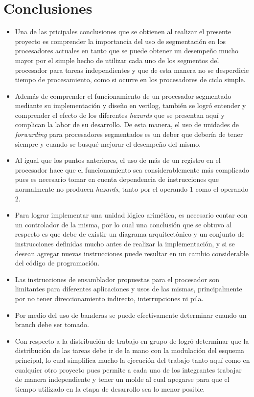 \newpage
\section{Conclusiones}

\begin{itemize}

\item Una de las pricipales conclusiones que se obtienen al realizar el presente proyecto es comprender la importancia del uso de segmentaci\' on en los procesadores actuales en tanto que se puede obtener un desempe\~ no mucho mayor por el simple hecho de utilizar cada uno de los segmentos del procesador para tareas independientes y que de esta manera no se desperdicie tiempo de procesamiento, como si ocurre en los procesadores de ciclo simple.
\item Adem\' as de comprender el funcionamiento de un procesador segmentado mediante su implementaci\' on y dise\~ no en verilog, tambi\' en se logr\' o entender y comprender el efecto de los diferentes \textit{hazards} que se presentan aqu\' i y complican la labor de su desarrollo. De esta manera, el uso de unidades de \textit{forwarding} para procesadores segmentados es un deber que deber\' ia de tener siempre y cuando se busqu\' e mejorar el desempe\~ no del mismo.
\item Al igual que los puntos anteriores, el uso de m\' as de un registro en el procesador hace que el funcionamiento sea considerablemente m\' as complicado pues es necesario tomar en cuenta dependencia de instrucciones que normalmente no producen \textit{hazards}, tanto por el operando 1 como el operando 2.
\item Para lograr implementar una unidad l\' ogico arim\' etica, es necesario contar con un controlador de la misma, por lo cual una conclusi\' on que se obtuvo al respecto es que debe de existir un diagrama arquitect\' onico y un conjunto de instrucciones definidas mucho antes de realizar la implementaci\' on, y si se desean agregar nuevas instrucciones puede resultar en un cambio considerable del c\' odigo de programaci\' on.
\item Las instrucciones de ensamblador propuestas para el procesador son limitantes para diferentes aplicaciones y usos de las mismas, principalmente por no tener direccionamiento indirecto, interrupciones ni pila.
\item Por medio del uso de banderas se puede efectivamente determinar cuando un branch debe ser tomado.
\item Con respecto a la distribuci\' on de trabajo en grupo de logr\' o determinar que la distribuci\' on de las tareas debe ir de la mano con la modulaci\' on del esquema principal, lo cual simplifica mucho la ejecuci\' on del trabajo tanto aqu\' i como en cualquier otro proyecto pues permite a cada uno de los integrantes trabajar de manera independiente y tener un molde al cual apegarse para que el tiempo utilizado en la etapa de desarrollo sea lo menor posible.

\end{itemize}



